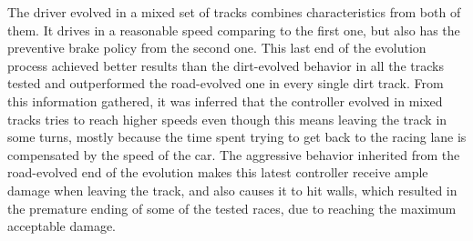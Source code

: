 	The driver evolved in a mixed set of tracks combines characteristics from both of them. It drives in a reasonable speed comparing to the first one, but also has the preventive brake policy from the second one. This last end of the evolution process achieved better results than the dirt-evolved behavior in all the tracks tested and outperformed the road-evolved one in every single dirt track. From this information gathered, it was inferred that the controller evolved in mixed tracks tries to reach higher speeds even though this means leaving the track in some turns, mostly because the time spent trying to get back to the racing lane is compensated by the speed of the car. The aggressive behavior inherited from the road-evolved end of the evolution makes this latest controller receive ample damage when leaving the track, and also causes it to hit walls, which resulted in the premature ending of some of the tested races, due to reaching the maximum acceptable damage.
	
